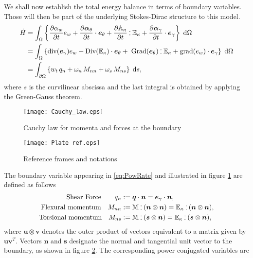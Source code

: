 \documentclass[preprint,12pt]{elsarticle}
\newcommand{\RevOne}[1]{\textcolor{blue!80!black}{#1}}
\def\onedot{$\mathsurround0pt\ldotp$}
\def\cddot{%
	\mathbin{\vcenter{\baselineskip.67ex
			\hbox{\onedot}\hbox{\onedot}}%
}}
\begin{document}
\RevOne{
We shall now establish the total energy balance in terms of boundary variables. Those  will then be part of the underlying Stokes-Dirac structure to this model.
\begin{equation}
\label{eq:PowRate}
\begin{aligned}
\dot{H}&= \int_{\Omega} \left\{ \diffp{\alpha_w}{t} e_w  + \diffp{\bm\alpha_\theta}{t} \cdot \bm{e}_\theta + \diffp{\mathbb{A}_{\kappa}}{t} \cddot \mathbb{E}_{\kappa}  + \diffp{\bm\alpha_{\gamma}}{t} \cdot \bm{e}_{\gamma} \right\} \d\Omega\\
&= \int_{\Omega} \left\{ \mathrm{div}(\bm{e}_{\gamma}) e_w  + \mathrm{Div}(\mathbb{E}_{\kappa}) \cdot \bm{e}_\theta + \; \mathrm{Grad}(\bm{e}_{\theta}) \cddot \mathbb{E}_{\kappa}  + \mathrm{grad} (e_w) \cdot \bm{e}_{\gamma} \right\} \d\Omega \\
&= \int_{\partial \Omega} \left\{ w_t \, q_n  + \omega_n \, M_{nn} + \omega_s \, M_{ns} \right\} \d{s},  \\
\end{aligned}
\end{equation}
where $s$ is the curvilinear abscissa and the last integral is obtained by applying the Green-Gauss theorem.
\begin{figure}
		\centering
		\texttt{[image: Cauchy\_law.eps]}
		\caption{Cauchy law for momenta and forces at the boundary}
		\label{fig:Cauchy_law}
\end{figure}
\begin{figure}[t]
		\centering
		\texttt{[image: Plate\_ref.eps]}
		\caption{Reference frames and notations}
		\label{fig:plate_ref}
\end{figure}
The boundary variable appearing in \eqref{eq:PowRate} and illustrated in figure \ref{fig:Cauchy_law} are defined as follows
\begin{equation}
\label{eq:QnMnnMns}
\begin{aligned}
\text{Shear Force}  \qquad q_{n} &:= \bm{q} \cdot \bm{n}=  \bm{e}_{\gamma} \cdot \bm{n},  \\
\text{Flexural momentum} \quad 
M_{nn} &:=  \mathbb{M} \cddot (\bm{n}\otimes{\bm{n}}) = \mathbb{E}_{\kappa} \cddot (\bm{n}\otimes{\bm{n}}) 	\\
\text{Torsional momentum} \quad M_{ns} &:= \mathbb{M} \cddot (\bm{s}\otimes{\bm{n}}) = \mathbb{E}_{\kappa} \cddot (\bm{s} \otimes{\bm{n}}),	
\end{aligned},
\end{equation}
where $\bm{u} \otimes {\bm{v}}$ denotes the outer product of vectors equivalent to a matrix given by $\bm{u}\bm{v}^T$. Vectors $\bm{n}$ and $\bm{s}$ designate the normal and tangential unit vector to the boundary, as shown in figure \ref{fig:plate_ref}. The corresponding power conjugated variables are
}
\end{document}
